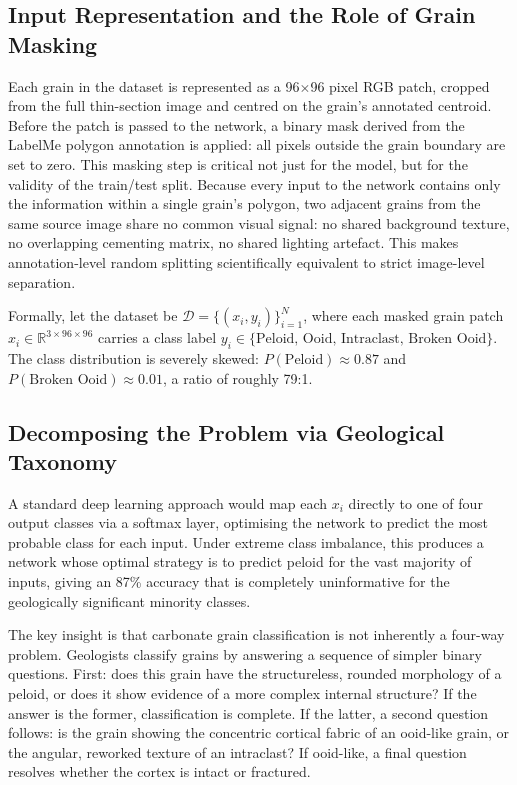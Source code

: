 \documentclass[a4paper,fleqn]{cas-dc}
\begin{document}
\subsection{Input Representation and the Role of Grain Masking}
Each grain in the dataset is represented as a 96$\times$96 pixel RGB patch, cropped from the full thin-section image and centred on the grain's annotated centroid. Before the patch is passed to the network, a binary mask derived from the LabelMe polygon annotation is applied: all pixels outside the grain boundary are set to zero. This masking step is critical not just for the model, but for the validity of the train/test split. Because every input to the network contains only the information within a single grain's polygon, two adjacent grains from the same source image share no common visual signal: no shared background texture, no overlapping cementing matrix, no shared lighting artefact. This makes annotation-level random splitting scientifically equivalent to strict image-level separation.

Formally, let the dataset be $\mathcal{D} = \{(x_i, y_i)\}_{i=1}^N$, where each masked grain patch $x_i \in \mathbb{R}^{3 \times 96 \times 96}$ carries a class label $y_i \in \{\text{Peloid, Ooid, Intraclast, Broken Ooid}\}$. The class distribution is severely skewed: $P(\text{Peloid}) \approx 0.87$ and $P(\text{Broken Ooid}) \approx 0.01$, a ratio of roughly 79:1.

\subsection{Decomposing the Problem via Geological Taxonomy}
A standard deep learning approach would map each $x_i$ directly to one of four output classes via a softmax layer, optimising the network to predict the most probable class for each input. Under extreme class imbalance, this produces a network whose optimal strategy is to predict peloid for the vast majority of inputs, giving an 87\% accuracy that is completely uninformative for the geologically significant minority classes.

The key insight is that carbonate grain classification is not inherently a four-way problem. Geologists classify grains by answering a sequence of simpler binary questions. First: does this grain have the structureless, rounded morphology of a peloid, or does it show evidence of a more complex internal structure? If the answer is the former, classification is complete. If the latter, a second question follows: is the grain showing the concentric cortical fabric of an ooid-like grain, or the angular, reworked texture of an intraclast? If ooid-like, a final question resolves whether the cortex is intact or fractured.
\end{document}
